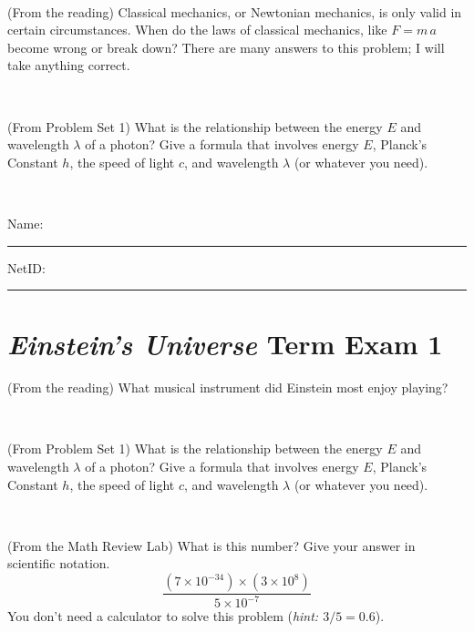 \documentclass[12pt, letterpaper]{article}
\begin{document}
\vfill ~

\begin{problem} (From the reading)
Classical mechanics, or Newtonian mechanics, is only valid in certain
circumstances. When do the laws of classical mechanics, like $F =
m\,a$ become wrong or break down? There are many answers to this
problem; I will take anything correct.
\end{problem}


\vfill ~

\begin{problem} (From Problem Set 1)
What is the relationship between the energy $E$ and wavelength
$\lambda$ of a photon? Give a formula that involves energy $E$,
Planck's Constant $h$, the speed of light $c$, and wavelength
$\lambda$ (or whatever you need).
\end{problem}

\vfill ~


\cleardoublepage



\noindent
Name: \rule[-1ex]{0.60\textwidth}{0.1pt}
NetID: \rule[-1ex]{0.20\textwidth}{0.1pt}

\section*{\textsl{Einstein's Universe} Term Exam 1}
\setcounter{problem}{1}


\begin{problem} (From the reading)
What musical instrument did Einstein most enjoy playing?
\end{problem}


\vfill ~

\begin{problem} (From Problem Set 1)
What is the relationship between the energy $E$ and wavelength
$\lambda$ of a photon? Give a formula that involves energy $E$,
Planck's Constant $h$, the speed of light $c$, and wavelength
$\lambda$ (or whatever you need).
\end{problem}

\vfill ~

\begin{problem} (From the Math Review Lab)
What is this number? Give your answer in scientific notation.
$$
\frac{(7\times10^{-34})\times(3\times10^8)}{5\times10^{-7}}
$$
You don't need a calculator to solve this problem (\textit{hint: $3/5=0.6$}).
\end{problem}


\vfill ~
\end{document}
